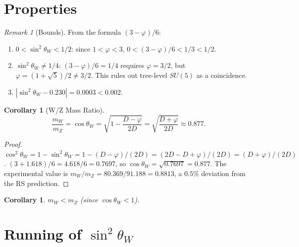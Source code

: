 \documentclass[12pt,a4paper]{article}
\newtheorem{corollary}[theorem]{Corollary}
\theoremstyle{definition}
\theoremstyle{remark}
\newtheorem{remark}[theorem]{Remark}
\begin{document}
\section{Properties}
\label{sec:properties}

\begin{remark}[Bounds]
\label{thm:bounds}
From the formula $(3-\varphi)/6$:
\begin{enumerate}[label=(\roman*)]
  \item $0 < \sin^2\theta_W < 1/2$: since $1 < \varphi < 3$,
  $0 < (3-\varphi)/6 < 1/3 < 1/2$.
  \item $\sin^2\theta_W \neq 1/4$: $(3-\varphi)/6 = 1/4$ requires
  $\varphi = 3/2$, but $\varphi = (1+\sqrt{5})/2 \neq 3/2$.
  This rules out tree-level $SU(5)$ as a coincidence.
  \item $|\sin^2\theta_W - 0.230| = 0.0003 < 0.002$.
\end{enumerate}
\end{remark}

\begin{corollary}[W/Z Mass Ratio]
\label{thm:wz}
\begin{equation}
  \frac{m_W}{m_Z} = \cos\theta_W
  = \sqrt{1 - \frac{D - \varphi}{2D}}
  = \sqrt{\frac{D + \varphi}{2D}} \approx 0.877.
\end{equation}
\end{corollary}

\begin{proof}
$\cos^2\theta_W = 1 - \sin^2\theta_W = 1 - (D-\varphi)/(2D)
= (2D - D + \varphi)/(2D) = (D + \varphi)/(2D)$.
$(3 + 1.618)/6 = 4.618/6 = 0.7697$, so
$\cos\theta_W = \sqrt{0.7697} = 0.877$.
The experimental value is $m_W/m_Z = 80.369/91.188 = 0.8813$, a
$0.5\%$ deviation from the RS prediction.
\end{proof}

\begin{corollary}
$m_W < m_Z$ (since $\cos\theta_W < 1$).
\end{corollary}

\section{Running of $\sin^2\theta_W$}
\label{sec:running}
\end{document}
